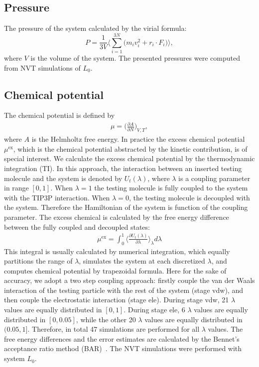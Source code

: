 \documentclass[a4paper,preprint,unsortedaddress,onecolumn,fleqn]{revtex4}
\begin{document}
\subsection{Pressure}

The pressure of the system calculated by the virial formula: 
\begin{equation*}
P=\frac{1}{3V}\Bigg\langle\sum_{i=1}^{3N}\Big(m_{i}\mathbf{\mathit{v}}%
_{i}^{2}+\mathbf{\mathit{r}}_{i}\cdot \mathbf{\mathit{F}}_{i}\Big)%
\Bigg\rangle,
\end{equation*}%
where $V$ is the volume of the system. The presented pressures were computed
from NVT simulations of $L_{0}$.

\subsection{Chemical potential}

The chemical potential is defined by 
\begin{align}
\mu = \Big(\frac{\partial A}{\partial N}\Big)_{V,T},
\end{align}
where $A$ is the Helmholtz free energy. In practice the excess chemical
potential $\mu^\text{ex}$, which is the chemical potential abstracted by the
kinetic contribution, is of special interest. We calculate the excess
chemical potential by the thermodynamic integration (TI). In this approach,
the interaction between an inserted testing molecule and the system is
denoted by $U_t(\lambda)$, where $\lambda$ is a coupling parameter in range $%
[0,1]$. When $\lambda = 1$ the testing molecule is fully coupled to the
system with the TIP3P interaction. When $\lambda=0$, the testing molecule is
decoupled with the system. Therefore the Hamiltonian of the system is
function of the coupling parameter. The excess chemical is calculated by the
free energy difference between the fully coupled and decoupled states: 
\begin{align}
\mu^\text{ex} = \int_0^1 \Big\langle \frac{\partial U_t(\lambda)}{\partial
\lambda} \Big\rangle_\lambda d\lambda
\end{align}
This integral is usually calculated by numerical integration, which equally
partitions the range of $\lambda$, simulates the system at each discretized $%
\lambda$, and computes chemical potential by trapezoidal formula. Here for
the sake of accuracy, we adopt a two step coupling approach: firstly couple
the van der Waals interaction of the testing particle with the rest of the
system (stage vdw), and then couple the electrostatic interaction (stage
ele). During stage vdw, 21 $\lambda$ values are equally distributed in $%
[0,1] $. During stage ele, 6 $\lambda$ values are equally distributed in $%
[0,0.05]$, while the other 20 $\lambda$ values are equally distributed in $%
(0.05, 1]$. Therefore, in total 47 simulations are performed for all $%
\lambda $ values. The free energy differences and the error estimates are
calculated by the Bennet's acceptance ratio method (BAR)~\cite%
{bennett1976efficient}. The NVT simulations were performed with system $L_0$.
\end{document}
